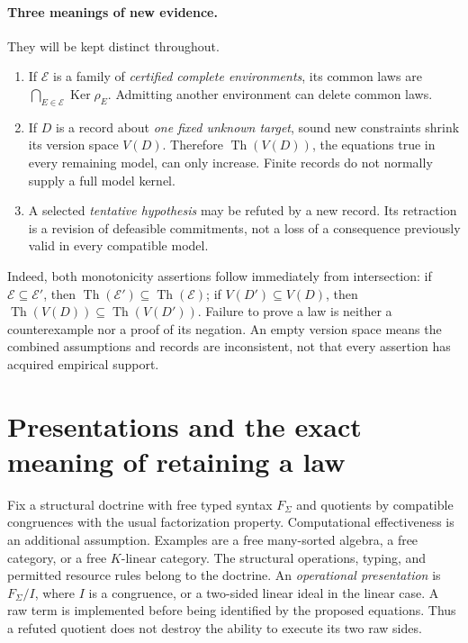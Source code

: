 \documentclass[11pt]{article}
\theoremstyle{definition}
\theoremstyle{remark}\newtheorem{remark}[theorem]{Remark}
\newcommand{\Ker}{\operatorname{Ker}}
\newcommand{\Th}{\operatorname{Th}}
\begin{document}
\paragraph{Three meanings of new evidence.}
They will be kept distinct throughout.
\begin{enumerate}
\item If $\mathcal E$ is a family of \emph{certified complete environments},
      its common laws are $\bigcap_{E\in\mathcal E}\Ker\rho_E$.
      Admitting another environment can delete common laws.
\item If $D$ is a record about \emph{one fixed unknown target}, sound new
      constraints shrink its version space $V(D)$. Therefore
      $\Th(V(D))$, the equations true in every remaining model, can only
      increase. Finite records do not normally supply a full model kernel.
\item A selected \emph{tentative hypothesis} may be refuted by a new record.
      Its retraction is a revision of defeasible commitments, not a loss of
      a consequence previously valid in every compatible model.
\end{enumerate}
Indeed, both monotonicity assertions follow immediately from intersection:
if $\mathcal E\subseteq\mathcal E'$, then
$\Th(\mathcal E')\subseteq\Th(\mathcal E)$; if
$V(D')\subseteq V(D)$, then $\Th(V(D))\subseteq\Th(V(D'))$.
Failure to prove a law is neither a counterexample nor a proof of its
negation. An empty version space means the combined assumptions and records
are inconsistent, not that every assertion has acquired empirical support.

\section{Presentations and the exact meaning of retaining a law}
\label{sec:presentations}
Fix a structural doctrine with free typed syntax $F_\Sigma$ and quotients by compatible congruences with the usual
factorization property. Computational effectiveness is an additional assumption. Examples are a free
many-sorted algebra, a free category, or a free $K$-linear category. The
structural operations, typing, and permitted resource rules belong to the
doctrine. An \emph{operational presentation} is $F_\Sigma/I$, where $I$ is
a congruence, or a two-sided linear ideal in the linear case. A raw term is
implemented before being identified by the proposed equations. Thus a
refuted quotient does not destroy the ability to execute its two raw sides.
\end{document}
